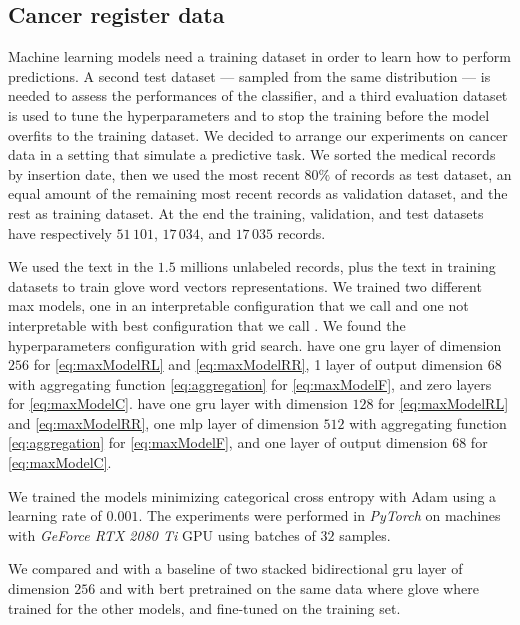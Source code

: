 \subsection{Cancer register data}
Machine learning models need a training dataset in order to learn how
to perform predictions. A second test dataset — sampled from the same
distribution — is needed to assess the performances of the
classifier, and a third evaluation dataset is used to tune the
hyperparameters and to stop the training before the model overfits to
the training dataset. We decided to arrange our experiments on cancer
data in 
a setting that simulate a predictive task. We sorted the medical
records by insertion date, then we used the most recent $80\%$ of
records as test 
dataset, an equal amount of the remaining most recent records as
validation dataset, and the rest as training dataset. At the end the
training, validation, and test datasets have respectively $51\,101$,
$17\,034$, and $17\,035$ records.

We used the text in the $1.5$ millions unlabeled records, plus the
text in training datasets to train \ac{glove} word
vectors representations. We trained two different \ac{max} models, one
in an interpretable configuration that we call \maxi{} and one not
interpretable with 
best configuration that we call \maxb{}. We found the hyperparameters
configuration with grid search. 
\maxi{} have one \ac{gru} layer of dimension $256$
for \eqref{eq:maxModelRL} and \eqref{eq:maxModelRR}, 1 layer of
output dimension $68$ with aggregating function \eqref{eq:aggregation}
for \eqref{eq:maxModelF}, and zero layers for \eqref{eq:maxModelC}. 
\maxb{} have
one \ac{gru} layer with
dimension $128$ for \eqref{eq:maxModelRL} and \eqref{eq:maxModelRR},
one \ac{mlp} layer of dimension $512$ with aggregating function
\eqref{eq:aggregation} for \eqref{eq:maxModelF}, and
one layer of output dimension $68$ for \eqref{eq:maxModelC}.

We trained the models minimizing categorical cross entropy with Adam
\cite{kingma2014adam} using a learning rate of $0.001$. The
experiments were performed in \emph{PyTorch} on machines with
\emph{GeForce RTX 2080 Ti} 
GPU using batches of $32$ samples.

We compared \maxb{} and \maxi{} with a baseline of two stacked
bidirectional 
\ac{gru} layer of dimension $256$ and with \ac{bert} pretrained on the
same data where \ac{glove} where trained for the other models, and
fine-tuned on the training set.

